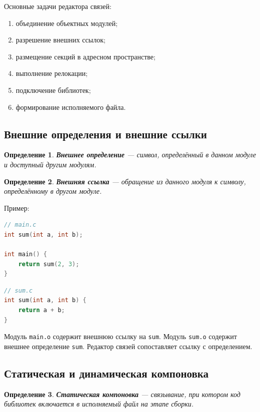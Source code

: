 \documentclass[12pt,a4paper]{article}
\newtheorem{definition}{Определение}
\begin{document}
Основные задачи редактора связей:
\begin{enumerate}
  \item объединение объектных модулей;
  \item разрешение внешних ссылок;
  \item размещение секций в адресном пространстве;
  \item выполнение релокации;
  \item подключение библиотек;
  \item формирование исполняемого файла.
\end{enumerate}

\subsection{Внешние определения и внешние ссылки}

\begin{definition}
\textbf{Внешнее определение} --- символ, определённый в данном модуле и доступный другим модулям.
\end{definition}

\begin{definition}
\textbf{Внешняя ссылка} --- обращение из данного модуля к символу, определённому в другом модуле.
\end{definition}

Пример:

\begin{lstlisting}[language=C]
// main.c
int sum(int a, int b);

int main() {
    return sum(2, 3);
}
\end{lstlisting}

\begin{lstlisting}[language=C]
// sum.c
int sum(int a, int b) {
    return a + b;
}
\end{lstlisting}

Модуль \texttt{main.o} содержит внешнюю ссылку на \texttt{sum}. Модуль \texttt{sum.o} содержит внешнее определение \texttt{sum}. Редактор связей сопоставляет ссылку с определением.

\subsection{Статическая и динамическая компоновка}

\begin{definition}
\textbf{Статическая компоновка} --- связывание, при котором код библиотек включается в исполняемый файл на этапе сборки.
\end{definition}
\end{document}
